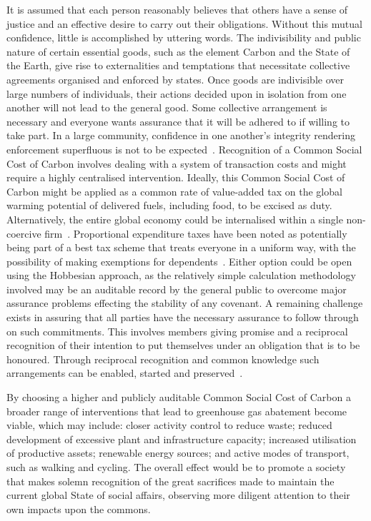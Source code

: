 \documentclass[11pt, oneside]{article}   	%
\begin{document}
It is assumed that each person reasonably believes that others have a sense of justice and an effective desire to carry out their obligations.
Without this mutual confidence, little is accomplished by uttering words.
The indivisibility and public nature of certain essential goods, such as the element Carbon and the State of the Earth, give rise to externalities and temptations that necessitate collective agreements organised and enforced by states.
Once goods are indivisible over large numbers of individuals, their actions decided upon in isolation from one another will not lead to the general good.
Some collective arrangement is necessary and everyone wants assurance that it will be adhered to if willing to take part. In a large community, confidence in one another's integrity rendering enforcement superfluous is not to be expected~\cite{jr1}.
Recognition of a Common Social Cost of Carbon involves dealing with a system of transaction costs and might require a highly centralised intervention.
Ideally, this Common Social Cost of Carbon might be applied as a common rate of value-added tax on the global warming potential of delivered fuels, including food, to be excised as duty.
Alternatively, the entire global economy could be internalised within a single non-coercive firm~\cite{rc1}.
Proportional expenditure taxes have been noted as potentially being part of a best tax scheme that treats everyone in a uniform way, with the possibility of making exemptions for dependents~\cite{nk1}.
Either option could be open using the Hobbesian approach, as the relatively simple calculation methodology involved may be an auditable record by the general public to overcome major assurance problems effecting the stability of any covenant.
A remaining challenge exists in assuring that all parties have the necessary assurance to follow through on such commitments.
This involves members giving promise and a reciprocal recognition of their intention to put themselves under an obligation that is to be honoured.
Through reciprocal recognition and common knowledge such arrangements can be enabled, started and preserved~\cite{hp1}.\

By choosing a higher and publicly auditable Common Social Cost of Carbon a broader range of interventions that lead to greenhouse gas abatement become viable, which may include: closer activity control to reduce waste; reduced development of excessive plant and infrastructure capacity; increased utilisation of productive assets; renewable energy sources; and active modes of transport, such as walking and cycling.
The overall effect would be to promote a society that makes solemn recognition of the great sacrifices made to maintain the current global State of social affairs, observing more diligent attention to their own impacts upon the commons.\
\end{document}
